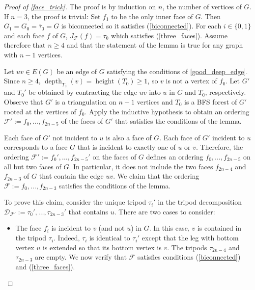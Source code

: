 \documentclass{patmorin}
\DeclareMathOperator{\height}{height}
\DeclareMathOperator{\depth}{depth}
\begin{document}
\begin{proof}[Proof of \cref{face_trick}]
  The proof is by induction on $n$, the number of vertices of $G$.  If $n=3$, the proof is trivial: Set $f_1$ to be the only inner face of $G$.  Then $G_1=G_0=\overline{\tau}_0=G$ is biconnected so it satisfies (\ref{biconnected}).  For each $i\in\{0,1\}$ and each face $f$ of $G$, $J_{\mathcal{F}}(f)=\tau_0$ which satisfies (\ref{three_faces}).  Assume therefore that $n\ge 4$ and that the statement of the lemma is true for any graph with $n-1$ vertices.

  Let $uv\in E(G)$ be an edge of $G$ satisfying the conditions of \cref{good_deep_edge}.  Since $n\ge 4$, $\depth_{T_0}(v)=\height(T_0)\ge 1$, so $v$ is not a vertex of $f_0$. Let $G'$ and $T_0'$ be obtained by contracting the edge $uv$ into $u$ in $G$ and $T_0$, respectively.  Observe that $G'$ is a triangulation on $n-1$ vertices and $T_0$ is a BFS forest of $G'$ rooted at the vertices of $f_0$.   Apply the inductive hypothesis to obtain an ordering $\mathcal{F}':=f_0,\ldots,f_{2n-5}$ of the faces of $G'$ that satisfies the conditions of the lemma.

  Each face of $G'$ not incident to $u$ is also a face of $G$.  Each face of $G'$ incident to $u$ corresponds to a face $G$ that is incident to exactly one of $u$ or $v$.
  Therefore, the ordering $\mathcal{F}':=f_0',\ldots,f_{2n-5}'$ on the faces of $G$ defines an ordering $f_0,\ldots,f_{2n-5}$ on all but two faces of $G$.  In particular, it does not include the two faces $f_{2n-4}$ and $f_{2n-3}$ of $G$ that contain the edge $uv$.  We claim that the ordering $\mathcal{F}:=f_0,\ldots,f_{2n-3}$ satisfies the conditions of the lemma.

  To prove this claim, consider the unique tripod $\tau_i'$ in the tripod decomposition $\mathcal{D}_{\mathcal{F'}}:=\tau_0',\ldots,\tau_{2n-3}'$ that contains $u$.  There are two cases to consider:

  \begin{itemize}
    \item The face $f_i$ is incident to $v$ (and not $u$) in $G$.  In this case, $v$ is contained in the tripod $\tau_i$.  Indeed, $\tau_i$ is identical to $\tau_i'$ except that the leg with bottom vertex $u$ is extended so that its bottom vertex is $v$.  The tripods $\tau_{2n-4}$ and $\tau_{2n-3}$ are empty.  We now verify that $\mathcal{F}$ satisfies conditions (\ref{biconnected}) and (\ref{three_faces}).


\end{itemize}
\end{proof}
\end{document}
